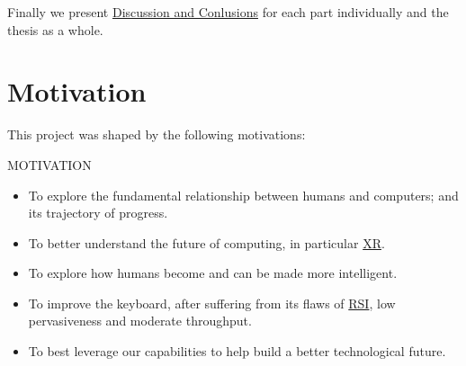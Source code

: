 \documentclass[logo,bsc,singlespacing,parskip]{infthesis}
\begin{document}
Finally we present \hyperref[sec:org68cb77f]{Discussion and Conlusions} for each part individually and the thesis as a whole.

\chapter*{Motivation}
\label{sec:org9603ff4}

This project was shaped by the following motivations:

\begin{mdframed}
\begin{description}
\item[{MOTIVATION}] 
\end{description}


\begin{itemize}
\item To explore the fundamental relationship between humans and computers; and its trajectory of progress.

\item To better understand the future of computing, in particular \hyperref[org39cbd51]{XR}.

\item To explore how humans become and can be made more intelligent.

\item To improve the keyboard, after suffering from its flaws of \hyperref[org77f0234]{RSI}, low pervasiveness and moderate throughput.

\item To best leverage our capabilities to help build a better technological future.
\end{itemize}
\end{mdframed}
\end{document}
